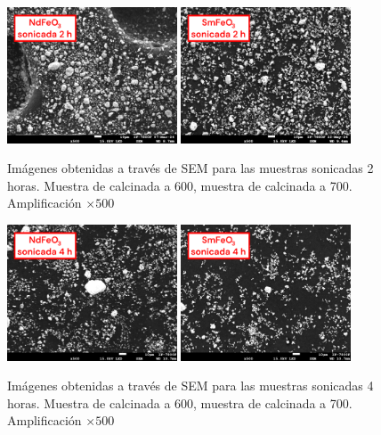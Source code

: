 \documentclass[../main.tex]{subfiles}
\begin{document}
\begin{figure}[H]
    \centering
    \includegraphics[width=0.45\textwidth]{fig/semneod2h.png}
    \quad
    \includegraphics[width=0.45\textwidth]{fig/semsama2h.png}
    \caption{Imágenes obtenidas a través de SEM para las muestras sonicadas 2 horas. Muestra de \neod{} calcinada a 600\gradoC{}, muestra de \sama{} calcinada a 700\gradoC{}. Amplificación $\times500$}
    \label{fig:resSEMsonicada2}
\end{figure}
\begin{figure}[H]
    \centering
    \includegraphics[width=0.45\textwidth]{fig/semneod4h.png}
    \quad
    \includegraphics[width=0.45\textwidth]{fig/semsama4h.png}
    \caption{Imágenes obtenidas a través de SEM para las muestras sonicadas 4 horas. Muestra de \neod{} calcinada a 600\gradoC{}, muestra de \sama{} calcinada a 700\gradoC{}. Amplificación $\times500$}
    \label{fig:resSEMsonicada4}
\end{figure}
\end{document}
